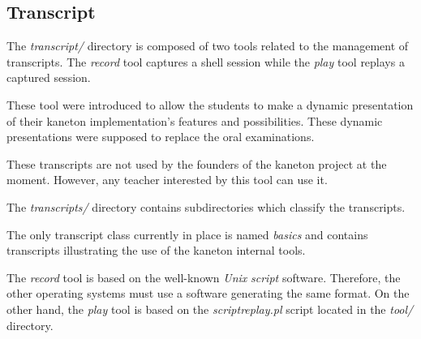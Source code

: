 %
%
%
%
%
%

%
%

\subsection{Transcript}
\label{section:transcript}

The \textit{transcript/} directory is composed of two tools related to
the management of transcripts. The \textit{record} tool captures a
shell session while the \textit{play} tool replays a captured session.

These tool were introduced to allow the students to make a dynamic presentation
of their kaneton implementation's features and possibilities. These dynamic
presentations were supposed to replace the oral examinations.

These transcripts are not used by the founders of the kaneton project at
the moment. However, any teacher interested by this tool can use it.

The \textit{transcripts/} directory contains subdirectories which classify
the transcripts.

The only transcript class currently in place is named \textit{basics} and
contains transcripts illustrating the use of the kaneton internal tools.

The \textit{record} tool is based on the well-known \textit{Unix}
\textit{script} software. Therefore, the other operating systems must use
a software generating the same format. On the other hand, the \textit{play}
tool is based on the \textit{scriptreplay.pl} script located in the
\textit{tool/} directory.
